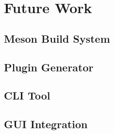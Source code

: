 \section{Future Work}\label{sec:future}

  \subsection{Meson Build System}\label{sec:future-meson}

  \subsection{Plugin Generator}\label{sec:future-plugin-generator}

  \subsection{CLI Tool}\label{sec:future-cli}

  \subsection{GUI Integration}\label{sec:future-gui}
